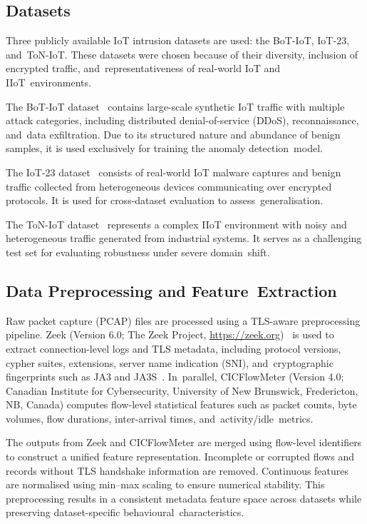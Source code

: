 \documentclass[futureinternet,article,accept,moreauthors]{Definitions/mdpi}
\begin{document}
\subsection{Datasets}

Three publicly available IoT intrusion datasets are used: the BoT-IoT, IoT-23, and~ToN-IoT. These datasets were chosen because of their diversity, inclusion of encrypted traffic, and~representativeness of real-world IoT and IIoT~environments.

The BoT-IoT dataset~\cite{koroniotis2019} contains large-scale synthetic IoT traffic with multiple attack categories, including distributed denial-of-service (DDoS), reconnaissance, and~data exfiltration. Due to its structured nature and abundance of benign samples, it is used exclusively for training the anomaly detection~model.

The IoT-23 dataset~\cite{garcia2020} consists of real-world IoT malware captures and benign traffic collected from heterogeneous devices communicating over encrypted protocols. It is used for cross-dataset evaluation to assess~generalisation.

The ToN-IoT dataset~\cite{moustafa2021a} represents a complex IIoT environment with noisy and heterogeneous traffic generated from industrial systems. It serves as a challenging test set for evaluating robustness under severe domain~shift.

\subsection{Data Preprocessing and Feature~Extraction}

Raw packet capture (PCAP) files are processed using a TLS-aware preprocessing pipeline. Zeek (Version 6.0; The Zeek Project, \url{https://zeek.org})~\cite{zeek2023} is used to extract connection-level logs and TLS metadata, including protocol versions, cypher suites, extensions, server name indication (SNI), and~cryptographic fingerprints such as JA3 and JA3S~\cite{althouse2019}. In~parallel, CICFlowMeter (Version 4.0; Canadian Institute for Cybersecurity, University of New Brunswick, Fredericton, NB, Canada) computes flow-level statistical features such as packet counts, byte volumes, flow durations, inter-arrival times, and~activity/idle~metrics.

The outputs from Zeek and CICFlowMeter are merged using flow-level identifiers to construct a unified feature representation. Incomplete or corrupted flows and records without TLS handshake information are removed. Continuous features are normalised using min--max scaling to ensure numerical stability. This preprocessing results in a consistent metadata feature space across datasets while preserving dataset-specific \mbox{behavioural~characteristics.}
\end{document}
